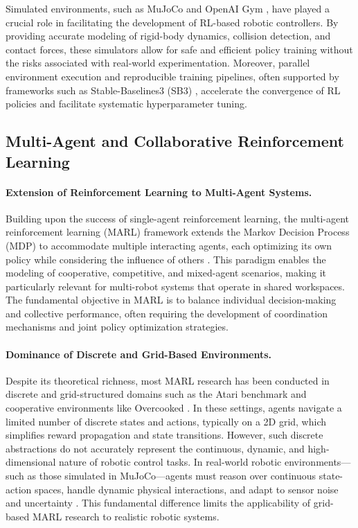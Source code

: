 \documentclass[english, 12pt, a4paper, elec, utf8, a-2b, online]{aaltothesis}
\begin{document}
Simulated environments, such as MuJoCo \cite{todorov2012mujoco} and OpenAI Gym \cite{brockman2016openai}, have played a crucial role in facilitating the development of RL-based robotic controllers. By providing accurate modeling of rigid-body dynamics, collision detection, and contact forces, these simulators allow for safe and efficient policy training without the risks associated with real-world experimentation. Moreover, parallel environment execution and reproducible training pipelines, often supported by frameworks such as Stable-Baselines3 (SB3) \cite{raffin2021stable}, accelerate the convergence of RL policies and facilitate systematic hyperparameter tuning.

\subsection{Multi-Agent and Collaborative Reinforcement Learning}

\paragraph{Extension of Reinforcement Learning to Multi-Agent Systems.}
Building upon the success of single-agent reinforcement learning, the multi-agent reinforcement learning (MARL) framework extends the Markov Decision Process (MDP) to accommodate multiple interacting agents, each optimizing its own policy while considering the influence of others \cite{zhang2021multi}. This paradigm enables the modeling of cooperative, competitive, and mixed-agent scenarios, making it particularly relevant for multi-robot systems that operate in shared workspaces. The fundamental objective in MARL is to balance individual decision-making and collective performance, often requiring the development of coordination mechanisms and joint policy optimization strategies.

\paragraph{Dominance of Discrete and Grid-Based Environments.}
Despite its theoretical richness, most MARL research has been conducted in discrete and grid-structured domains such as the Atari benchmark \cite{mnih2015human} and cooperative environments like Overcooked \cite{carroll2019utility}. In these settings, agents navigate a limited number of discrete states and actions, typically on a 2D grid, which simplifies reward propagation and state transitions. However, such discrete abstractions do not accurately represent the continuous, dynamic, and high-dimensional nature of robotic control tasks. In real-world robotic environments—such as those simulated in MuJoCo—agents must reason over continuous state-action spaces, handle dynamic physical interactions, and adapt to sensor noise and uncertainty \cite{iqbal2019actor, mahajan2019maven}. This fundamental difference limits the applicability of grid-based MARL research to realistic robotic systems.
\end{document}
